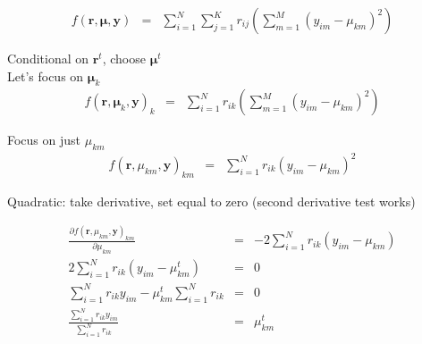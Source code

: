 \documentclass{beamer}
\numberwithin{equation}{section}
\begin{document}
\begin{frame}


\begin{eqnarray}
f(\boldsymbol{r}, \boldsymbol{\mu}, \boldsymbol{y}) & = & \sum_{i=1}^{N} \sum_{j=1}^{K} r_{ij} \left(\sum_{m=1}^{M} (y_{im} - \mu_{km})^{2} \right) \nonumber 
\end{eqnarray}

Conditional on $\boldsymbol{r}^{t}$, choose $\boldsymbol{\mu}^{t}$\\
Let's focus on $\boldsymbol{\mu}_k$ \\
\begin{eqnarray}
f(\boldsymbol{r}, \boldsymbol{\mu}_{k}, \boldsymbol{y})_{k} & = & \sum_{i=1}^{N} r_{ik} \left(\sum_{m=1}^{M} (y_{im} - \mu_{km})^{2} \right) \nonumber
\end{eqnarray}  




\end{frame}


\begin{frame}

Focus on just $\mu_{km}$ 
\begin{eqnarray}
f(\boldsymbol{r}, \mu_{km}, \boldsymbol{y})_{km} & = & \sum_{i=1}^{N} r_{ik} (y_{im} - \mu_{km})^{2} \nonumber
\end{eqnarray}  

Quadratic: take derivative, set equal to zero (second derivative test works)

\begin{eqnarray}
\frac{\partial f(\boldsymbol{r}, \mu_{km}, \boldsymbol{y})_{km} } {\partial \mu_{km} } & = & -2 \sum_{i=1}^{N} r_{ik}(y_{im} - \mu_{km} ) \nonumber \\
2 \sum_{i=1}^{N} r_{ik}(y_{im} - \mu_{km}^{t} ) & = & 0 \nonumber \\
\sum_{i=1}^{N}r_{ik}y_{im} - \mu_{km}^{t}\sum_{i=1}^{N} r_{ik}  & = & 0 \nonumber \\
\frac{\sum_{i=1}^{N}r_{ik}y_{im}  }{\sum_{i=1}^{N} r_{ik} } & = & \mu_{km}^{t} \nonumber 
\end{eqnarray}


\end{frame}
\end{document}
